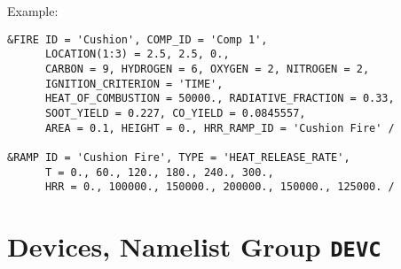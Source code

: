 \vspace{\baselineskip}
\noindent Example:
\begin{lstlisting}
&FIRE ID = 'Cushion', COMP_ID = 'Comp 1',
      LOCATION(1:3) = 2.5, 2.5, 0.,
      CARBON = 9, HYDROGEN = 6, OXYGEN = 2, NITROGEN = 2,
      IGNITION_CRITERION = 'TIME',
      HEAT_OF_COMBUSTION = 50000., RADIATIVE_FRACTION = 0.33,
      SOOT_YIELD = 0.227, CO_YIELD = 0.0845557,
      AREA = 0.1, HEIGHT = 0., HRR_RAMP_ID = 'Cushion Fire' /

&RAMP ID = 'Cushion Fire', TYPE = 'HEAT_RELEASE_RATE',
      T = 0., 60., 120., 180., 240., 300.,
      HRR = 0., 100000., 150000., 200000., 150000., 125000. /
\end{lstlisting}




\clearpage
\section{Devices, Namelist Group \texorpdfstring{{\tt DEVC}}{DEVC}}

\label{info:DEVC3}


